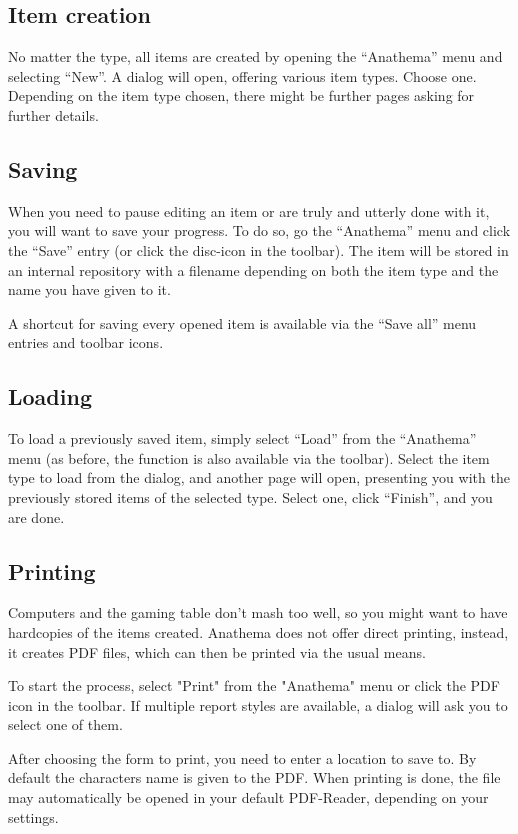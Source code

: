 \subsection{Item creation}
No matter the type, all items are created by opening the ``Anathema'' menu and selecting ``New''. A dialog will open, offering various item types. Choose one. Depending on the item type chosen, there might be further pages asking for further details.

\subsection{Saving}
When you need to pause editing an item or are truly and utterly done with it, you will want to save your progress. To do so, go the ``Anathema'' menu and click the ``Save'' entry (or click the disc-icon in the toolbar). The item will be stored in an internal repository with a filename depending on both the item type and the name you have given to it. 

A shortcut for saving every opened item is available via the ``Save all'' menu entries and toolbar icons.

\subsection{Loading}
To load a previously saved item, simply select ``Load'' from the ``Anathema'' menu (as before, the function is also available via the toolbar). Select the item type to load from the dialog, and another page will open, presenting you with the previously stored items of the selected type. Select one, click ``Finish'', and you are done.

\subsection{Printing}
Computers and the gaming table don't mash too well, so you might want to have hardcopies of the items created. Anathema does not offer direct printing, instead, it creates PDF files, which can then be printed via the usual means.

To start the process, select "Print" from the "Anathema" menu or click the PDF icon in the toolbar. If multiple report styles are available, a dialog will ask you to select one of them. 

After choosing the form to print, you need to enter a location to save to. By default the characters name is given to the PDF. When printing is done, the file may automatically be opened in your default PDF-Reader, depending on your settings.